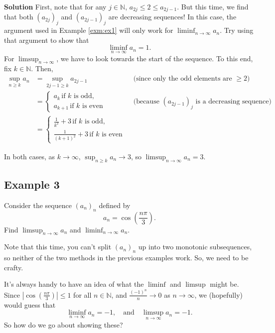 \documentclass[
  17pt,
  a4paper]{extarticle}
\theoremstyle{plain}
\theoremstyle{plain}
\theoremstyle{plain}
\theoremstyle{plain}
\theoremstyle{plain}
\theoremstyle{definition}
\theoremstyle{definition}
\theoremstyle{definition}
\theoremstyle{remark}
\let\BeginKnitrBlock\begin \let\EndKnitrBlock\end
\renewcommand{\;}{\,}
\begin{document}
\textbf{Solution}
First, note that for any \(j\in\mathbb{N}\), \(a_{2j} \leq 2 \leq a_{2j-1}\). But this time, we find that both \((a_{2j})_j\) and \((a_{2j-1})_j\) are decreasing sequences! In this case, the argument used in Example \ref{exm:ex1} will only work for \(\liminf_{n\to\infty} a_n.\) Try using that argument to show that \[\liminf_{n\to\infty}a_n = 1.\] For \(\limsup_{n\to\infty}\), we have to look towards the start of the sequence. To this end, fix \(k \in \mathbb{N}\). Then,
\begin{align*}
\sup_{n\geq k}a_n &= \sup_{2j-1 \geq k} a_{2j - 1} \; \; &&\text{(since only the odd elements are $\geq 2$)}\\
&=\begin{cases}
a_k \; \text{if $k$ is odd},\\
a_{k+1} \; \text{if $k$ is even}\end{cases} \; \; &&\text{(because $(a_{2j-1})_j$ is a decreasing sequence)}\\
&=\begin{cases}
\frac{1}{k^2} + 3 \; \text{if $k$ is odd},\\
\frac{1}{(k+1)^2} + 3 \; \text{if $k$ is even}\end{cases}
\end{align*}

In both cases, as \(k \to \infty\), \(\sup_{n\geq k }a_n \to 3\), so \(\limsup_{n \to \infty} a_n = 3\).

\hypertarget{example-3}{%
\subsection{Example 3}\label{example-3}}

\BeginKnitrBlock{example}
{\label{exm:ex3} }Consider the sequence \((a_n)_{n}\) defined by \[a_n = \cos\left(\frac{n\pi}{3}\right).\] Find \(\limsup_{n \to \infty} a_n\) and \(\liminf_{n \to \infty} a_n\).
\EndKnitrBlock{example}
Note that this time, you can't split \((a_n)_n\) up into two monotonic subsequences, so neither of the two methods in the previous examples work. So, we need to be crafty.

It's always handy to have an idea of what the \(\liminf\) and \(\limsup\) might be. Since \(\left\lvert\cos\left(\frac{n\pi}{3}\right)\right\rvert \leq 1\) for all \(n \in \mathbb{N}\), and \(\frac{(-1)^n}{n} \to 0\) as \(n \to \infty\), we (hopefully) would guess that \[\liminf_{n\to\infty}a_n = -1, \quad \text{and} \quad \limsup_{n \to \infty} a_n = -1.\] So how do we go about showing these?
\end{document}
